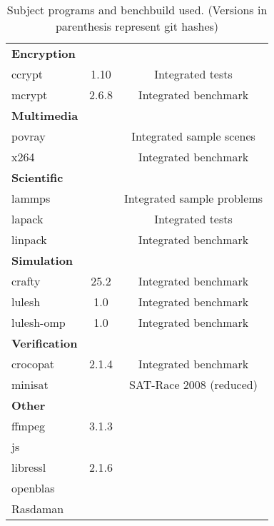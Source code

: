 \begin{table}[H]
\begin{tabularx}{\textwidth}{lcC}
        \midrule
        \textbf{Encryption}\\
        ccrypt & 1.10 & Integrated tests\\
        mcrypt & 2.6.8 & Integrated benchmark\\
        \midrule
        \textbf{Multimedia}\\
        povray &  & Integrated sample scenes\\
        x264 &  & Integrated benchmark\\
        \midrule
        \textbf{Scientific}\\
        lammps &  & Integrated sample problems\\
        lapack & & Integrated tests\\
        linpack & & Integrated benchmark\\
        \midrule
        \textbf{Simulation}\\
        crafty & 25.2 & Integrated benchmark\\
        lulesh & 1.0 & Integrated benchmark\\
        lulesh-omp & 1.0 & Integrated benchmark\\
        \midrule
        \textbf{Verification}\\
        crocopat & 2.1.4 & Integrated benchmark\\
        minisat &  & SAT-Race 2008 (reduced)\\
        \midrule
        \textbf{Other}\\
        ffmpeg & 3.1.3\\
        js\\
        libressl & 2.1.6\\
        openblas & \\
        Rasdaman & \\
        \bottomrule
    \end{tabularx}
    \caption[Subject programs]{Subject programs and benchbuild used. (Versions in parenthesis represent git hashes)}
\end{table}

